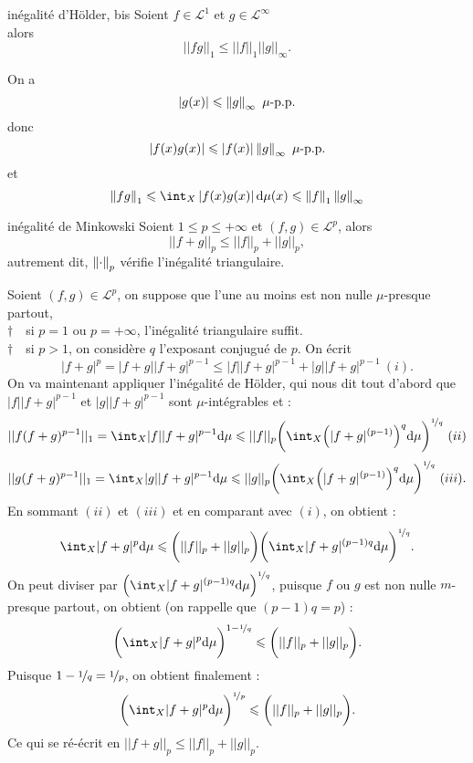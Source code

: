 \documentclass[a4paper,11pt, twoside]{article}
\begin{document}
\begin{propC}{inégalité d'Hölder, bis}
  Soient $f\in\mathcal L^1$ et $g\in\mathcal L^\infty$\\

  alors
  $$||fg||_1\leqslant||f||_1||g||_\infty.$$
\end{propC}


\begin{Proof}
  On a 
  $$\left| g(x)\right|\leqslant \left\lVert g\right\rVert_\infty\ \mu\text{-p.p.}$$
  donc 
  $$\left| f(x)g(x)\right|\leqslant \left| f(x)\right|\left\lVert g\right\rVert_\infty\ \mu\text{-p.p.}$$
  et
  $$\norm{fg}_1\leqslant\int_X\abs{f(x)g(x)}\mathrm d\mu(x)\leqslant\norm{f}_1\norm{g}_\infty$$
\end{Proof}
  
  
\begin{propC}{inégalité de Minkowski}
  Soient $1\leqslant p\leqslant+\infty$ et $(f,g)\in\mathcal L^p$, alors\\
  
  $$||f+g||_p\leqslant ||f||_p+||g||_p,$$
  autrement dit, $\left\lVert\cdot\right\rVert_p$ vérifie l'inégalité triangulaire.
\end{propC}
  
\begin{Proof}
  Soient $(f,g)\in\mathcal L^p$, on suppose que l'une au moins est non nulle $\mu$-presque partout,\\
  $\dagger\quad$si $p=1$ ou $p=+\infty$, l'inégalité triangulaire suffit.\\
  $\dagger\quad$si $p>1$, on considère $q$ l'exposant conjugué de $p$. On écrit $$|f+g|^p=|f+g||f+g|^{p-1}\leqslant|f||f+g|^{p-1}+|g||f+g|^{p-1}\ (i).$$ On va maintenant appliquer l'inégalité de Hölder, qui nous dit tout d'abord que $|f||f+g|^{p-1}$ et $|g||f+g|^{p-1}$ sont $\mu$-intégrables et :
  $$||f(f+g)^{p-1}||_1=\int_X|f||f+g|^{p-1}\mathrm d\mu \leqslant ||f||_p\bigg(\int_X\Big(|f+g|^{(p-1)}\Big)^q\mathrm d\mu\bigg)^{\nicefrac1q}\ (ii)$$
  $$||g(f+g)^{p-1}||_1=\int_X|g||f+g|^{p-1}\mathrm d\mu \leqslant ||g||_p\bigg(\int_X\Big(|f+g|^{(p-1)}\Big)^q\mathrm d\mu\bigg)^{\nicefrac1q}\ (iii).$$
  En sommant $(ii)$ et $(iii)$ et en comparant avec $(i)$, on obtient :
  $$\int_X|f+g|^p\mathrm d\mu \leqslant \bigg(||f||_p+||g||_p\bigg)\bigg(\int_X|f+g|^{(p-1)q}\mathrm d\mu\bigg)^{\nicefrac1q}.$$
  On peut diviser par $\dstyle\Big(\int_X|f+g|^{(p-1)q}\mathrm d\mu\Big)^{\nicefrac1q}$, puisque $f$ ou $g$ est non nulle $m$-presque partout, on obtient (on rappelle que $(p-1)q=p$) :
  $$\bigg(\int_X|f+g|^p\mathrm d\mu\bigg)^{1-\nicefrac1q} \leqslant \bigg(||f||_p+||g||_p\bigg).$$
  Puisque $\displaystyle1-\nicefrac1q=\nicefrac1p$, on obtient finalement :
  $$\bigg(\int_X|f+g|^p\mathrm d\mu\bigg)^{\nicefrac1p} \leqslant \bigg(||f||_p+||g||_p\bigg).$$
  Ce qui se ré-écrit en $||f+g||_p\leqslant ||f||_p+||g||_p$.
\end{Proof}
\end{document}
